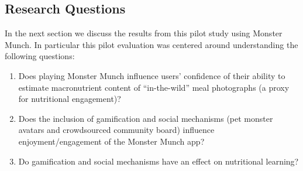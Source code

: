 \subsection{Research Questions}
In the next section we discuss the results from this pilot study using Monster Munch. In particular this pilot evaluation was centered around understanding the following questions:
\begin{enumerate}
    \item Does playing Monster Munch influence users' confidence of their ability to estimate macronutrient content of ``in-the-wild'' meal photographs (a proxy for nutritional engagement)?
    \item Does the inclusion of gamification and social mechanisms (pet monster avatars and crowdsourced community board) influence enjoyment/engagement of the Monster Munch app?
    \item Do gamification and social mechanisms have an effect on nutritional learning?
\end{enumerate}



 



